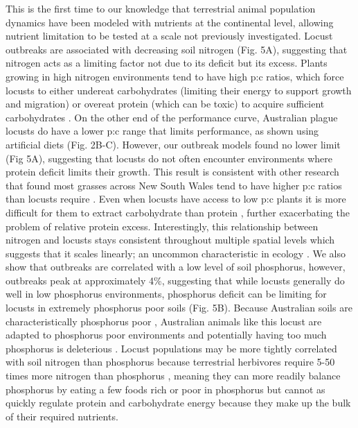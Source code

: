 \documentclass[
]{article}
\begin{document}
This is the first time to our knowledge that terrestrial animal
population dynamics have been modeled with nutrients at the continental
level, allowing nutrient limitation to be tested at a scale not
previously investigated. Locust outbreaks are associated with decreasing
soil nitrogen (Fig. 5A), suggesting that nitrogen acts as a limiting
factor not due to its deficit \citep{white_inadequate_1993} but its
excess. Plants growing in high nitrogen environments tend to have high
p:c ratios, which force locusts to either undereat carbohydrates
(limiting their energy to support growth and migration) or overeat
protein (which can be toxic) to acquire sufficient carbohydrates
\citep{behmer_insect_2009, cease_how_2024}. On the other end of the
performance curve, Australian plague locusts do have a lower p:c range
that limits performance, as shown using artificial diets (Fig. 2B-C).
However, our outbreak models found no lower limit (Fig 5A), suggesting
that locusts do not often encounter environments where protein deficit
limits their growth. This result is consistent with other research that
found most grasses across New South Wales tend to have higher p:c ratios
than locusts require \citep{lawton_mismatched_2021}. Even when locusts
have access to low p:c plants it is more difficult for them to extract
carbohydrate than protein \citep{clissold_paradoxical_2006}, further
exacerbating the problem of relative protein excess. Interestingly, this
relationship between nitrogen and locusts stays consistent throughout
multiple spatial levels which suggests that it scales linearly; an
uncommon characteristic in ecology
\citep{levin_problem_1992, wiens_spatial_1989}. We also show that
outbreaks are correlated with a low level of soil phosphorus, however,
outbreaks peak at approximately 4\%, suggesting that while locusts
generally do well in low phosphorus environments, phosphorus deficit can
be limiting for locusts in extremely phosphorus poor soils (Fig. 5B).
Because Australian soils are characteristically phosphorus poor
\citep{donald_colin_phosphorus_1964}, Australian animals like this
locust are adapted to phosphorus poor environments and potentially
having too much phosphorus is deleterious \citep{morton_fresh_2011}.
Locust populations may be more tightly correlated with soil nitrogen
than phosphorus because terrestrial herbivores require 5-50 times more
nitrogen than phosphorus \citep{elser_nutritional_2000}, meaning they
can more readily balance phosphorus by eating a few foods rich or poor
in phosphorus but cannot as quickly regulate protein and carbohydrate
energy because they make up the bulk of their required nutrients.
\end{document}
